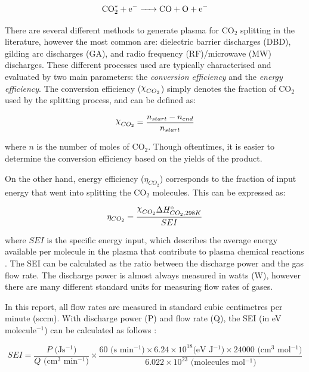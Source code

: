 \begin{equation}
    \ce{CO^*_2 + e^{-} -> CO + O + e^{-}}
    \label{ce:vibrational_exitation_electron}
\end{equation}

There are several different methods to generate plasma for CO$_2$ splitting in the literature, however the most common are: dielectric barrier discharges (DBD), gilding arc discharges (GA), and radio frequency (RF)/microwave (MW) discharges. These different processes used are typically characterised and evaluated by two main parameters: the \textit{conversion efficiency} and the \textit{energy efficiency}. The conversion efficiency ($\rchi_{CO_2}$) simply denotes the fraction of CO$_2$ used by the splitting process, and can be defined as:

\begin{equation}
    \rchi_{CO_2} = \frac{n_{start} - n_{end}}{n_{start}}
\end{equation}

where $n$ is the number of moles of CO$_2$. Though oftentimes, it is easier to determine the conversion efficiency based on the yields of the product.

On the other hand, energy efficiency ($\eta_{CO_2}$) corresponds to the fraction of input energy that went into splitting the CO$_2$ molecules. This can be expressed as:

\begin{equation}
    \eta_{CO_2} = \frac{\rchi_{CO_2} \Delta H^{\circ}_{CO_2, 298K}}{SEI}
\end{equation}

where $SEI$ is the specific energy input, which describes the average energy available per molecule in the plasma that contribute to plasma chemical reactions \cite{Hegemann2023}. The SEI can be calculated as the ratio between the discharge power and the gas flow rate. The discharge power is almost always measured in watts (W), however there are many different standard units for measuring flow rates of gases. 

In this report, all flow rates are measured in standard cubic centimetres per minute (sccm). With discharge power (P) and flow rate (Q), the SEI (in eV molecule$^{-1}$) can be calculated as follows \cite{Ozkan2015}:

\begin{equation}
    SEI = \frac{P \text{ (Js$^{-1}$)}}{Q \text{ (cm$^{3}$ min$^{-1}$)}} \times \frac{60 \text{ (s min$^{-1}$)} \times 6.24 \times 10^{18} \text{(eV J$^{-1}$)} \times 24000 \text{ (cm$^{3}$ mol$^{-1}$)}}{6.022 \times 10^{23} \text{ (molecules mol$^{-1}$)}}
\end{equation}

